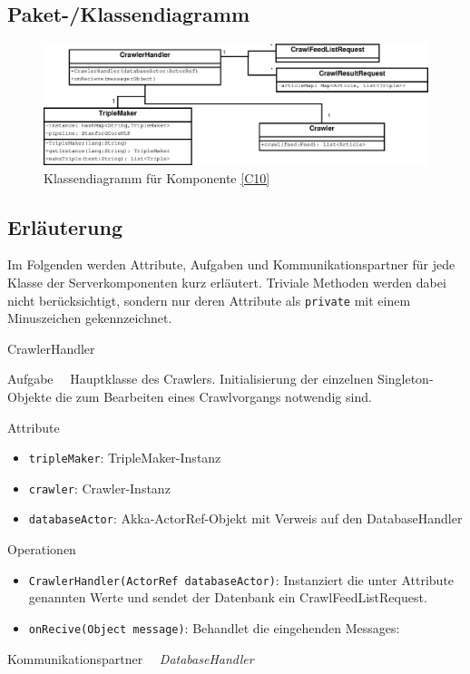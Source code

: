 \subsection{Paket-/Klassendiagramm}

\begin{figure}[ht]
\centering
\includegraphics[width=1.03\textwidth]{Systementwurf/05_implementierungsentwurf/crawler-objekte}
\caption{Klassendiagramm für Komponente \ref{C10}}
\end{figure}
 
\subsection{Erläuterung}

Im Folgenden werden Attribute, Aufgaben und Kommunikationspartner für jede
Klasse der Serverkomponenten kurz erläutert. Triviale Methoden werden dabei
nicht berücksichtigt, sondern nur deren Attribute als \texttt{private} mit einem
Minuszeichen gekennzeichnet.

\begin{class}{40}{CrawlerHandler}
\item[Aufgabe]~\
Hauptklasse des Crawlers. Initialisierung der einzelnen Singleton-Objekte die
zum Bearbeiten eines Crawlvorgangs notwendig sind.
\item[Attribute]~\
\begin{itemize}
  \item \texttt{tripleMaker}: TripleMaker-Instanz
  \item \texttt{crawler}: Crawler-Instanz
  \item \texttt{databaseActor}: Akka-ActorRef-Objekt mit Verweis auf den
  DatabaseHandler
\end{itemize}
\item[Operationen]~\
\begin{itemize}
  \item \texttt{CrawlerHandler(ActorRef databaseActor)}:
  Instanziert die unter Attribute genannten Werte und sendet der
  Datenbank ein CrawlFeedListRequest. 
  \item \texttt{onRecive(Object message)}: Behandlet die eingehenden Messages:
\end{itemize}
\item[Kommunikationspartner]~\
  \textit{DatabaseHandler}
\end{class}

